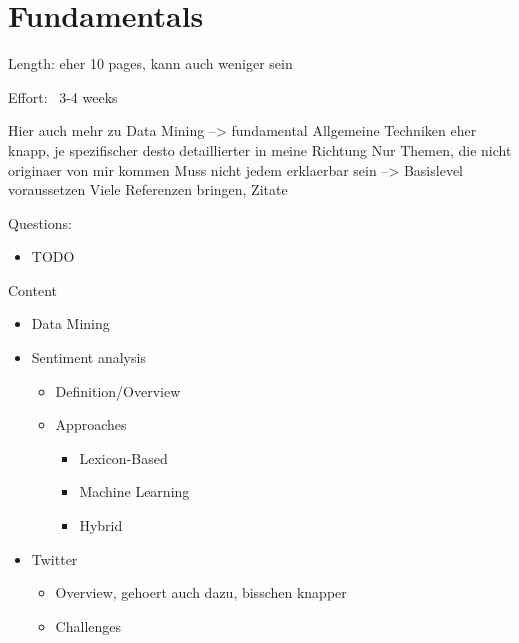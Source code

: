 \chapter{Fundamentals}
\label{cha:Chapter3_Fundamentals}

Length: eher 10 pages, kann auch weniger sein

Effort: ~3-4 weeks

Hier auch mehr zu Data Mining --> fundamental
Allgemeine Techniken eher knapp, je spezifischer desto detaillierter in meine Richtung
Nur Themen, die nicht originaer von mir kommen
Muss nicht jedem erklaerbar sein --> Basislevel voraussetzen
Viele Referenzen bringen, Zitate

Questions:
\begin{itemize}
\item TODO
\end{itemize}

Content
\begin{itemize}
\item Data Mining
\item Sentiment analysis
\begin{itemize}
\item Definition/Overview
\item Approaches
\begin{itemize}
\item Lexicon-Based
\item Machine Learning
\item Hybrid
\end{itemize}
\end{itemize}
\item Twitter
\begin{itemize}
\item Overview, gehoert auch dazu, bisschen knapper
\item Challenges
\end{itemize}

\end{itemize}

